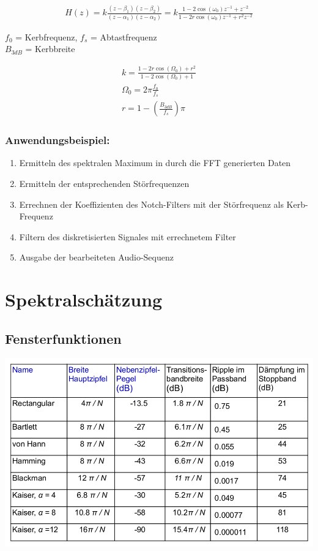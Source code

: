 \documentclass[10pt,a4paper]{article}
\begin{document}
  \begin{mdframed}[style=exercise]
    \begin{align}
  H(z) = k \frac{(z-\beta_1)(z-\beta_2)}{(z-\alpha_1)(z-\alpha_2)} 
       = k \frac{1-2\cos(\omega_0)z^{-1}+z^{-2}}{1-2r\cos(\omega_0)z^{-1}+r^2 z^{-2}}
    \end{align}
  \end{mdframed}
$f_0$ = Kerbfrequenz, $f_s$ = Abtastfrequenz \\
$B_{3dB}$ = Kerbbreite 
  \begin{mdframed}[style=exercise]
    \begin{align}
      k = \frac{1-2r\cos(\Omega_0)+r^2}{1-2\cos(\Omega_0)+1}\\
      \Omega_0 = 2\pi \frac{f_0}{f_s}\\
      r=1-(\frac{B_{3dB}}{f_s})\pi
    \end{align}
  \end{mdframed}

\subsubsection{Anwendungsbeispiel:}
\begin{enumerate}
  \item Ermitteln des spektralen Maximum in durch die FFT generierten Daten
  \item Ermitteln der entsprechenden Störfrequenzen
  \item Errechnen der Koeffizienten des Notch-Filters mit der Störfrequenz als Kerb-Frequenz
  \item Filtern des diskretisierten Signales mit errechnetem Filter
  \item Ausgabe der bearbeiteten Audio-Sequenz
\end{enumerate}

\section{Spektralschätzung}
\subsection{Fensterfunktionen}

\begin{center}
  \includegraphics[width=.5\textwidth]{./img/Fensterfunktionen_Vergleich.png}
\end{center}
\end{document}
